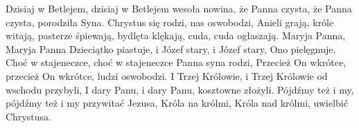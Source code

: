 \beginverse
Dzisiaj w Betlejem, dzisiaj w Betlejem
wesoła nowina,
że Panna czysta, że Panna czysta,
porodziła Syna.
\endverse
\beginchorus
Chrystus się rodzi, nas oswobodzi,
Anieli grają, króle witają,
pasterze śpiewają, bydlęta klękają,
cuda, cuda ogłaszają.
\endchorus
\beginverse
Maryja Panna, Maryja Panna
Dzieciątko piastuje,
i Józef stary, i Józef stary,
Ono pielęgnuje.
\endverse
\beginverse
Choć w stajeneczce, choć w stajeneczce
Panna syna rodzi,
Przecież On wkrótce, przecież On wkrótce,
ludzi oswobodzi.
\endverse
\beginverse
I Trzej Królowie, i Trzej Królowie
od wschodu przybyli,
I dary Panu, i dary Panu,
kosztowne złożyli.
\endverse
\beginverse
Pójdźmy też i my, pójdźmy też i my
przywitać Jezusa,
Króla na królmi, Króla nad królmi,
uwielbić Chrystusa.
\endverse
\endsong